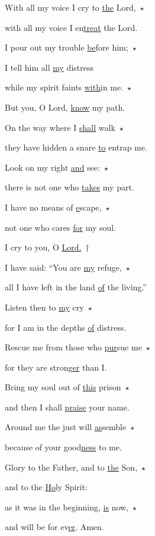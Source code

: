\noindent With all my voice I cry to \uline{the} Lord,~$\star$~\nopagebreak

with all my voice I en\uline{treat} the Lord.

\noindent I pour out my trouble \uline{be}fore him;~$\star$~\nopagebreak

I tell him all \uline{my} distress

\noindent while my spirit faints \uline{with}in me.~$\star$~\nopagebreak

But you, O Lord, \uline{know} my path.

\noindent On the way where I \uline{shall} walk~$\star$~\nopagebreak

they have hidden a snare \uline{to} entrap me.

\noindent Look on my right \uline{and} see:~$\star$~\nopagebreak

there is not one who \uline{takes} my part.

\noindent I have no means of \uline{e}scape,~$\star$~\nopagebreak

not one who cares \uline{for} my soul.

\noindent I cry to you, O \uline{Lord.}~†~\nopagebreak

I have said: “You are \uline{my} refuge,~$\star$~\nopagebreak

all I have left in the land \uline{of} the living.”

\noindent Listen then to \uline{my} cry~$\star$~\nopagebreak

for I am in the depths \uline{of} distress.

\noindent Rescue me from those who \uline{pur}sue me~$\star$~\nopagebreak

for they are strong\uline{er} than I.

\noindent Bring my soul out of \uline{this} prison~$\star$~\nopagebreak

and then I shall \uline{praise} your name.

\noindent Around me the just will \uline{as}semble~$\star$~\nopagebreak

because of your good\uline{ness} to me.

\noindent Glory to the Father, and to \uline{the} Son,~$\star$~\nopagebreak

and to the \uline{Ho}ly Spirit:

\noindent as it was in the beginning, \uline{is} now,~$\star$~\nopagebreak

and will be for ev\uline{er}. Amen.
